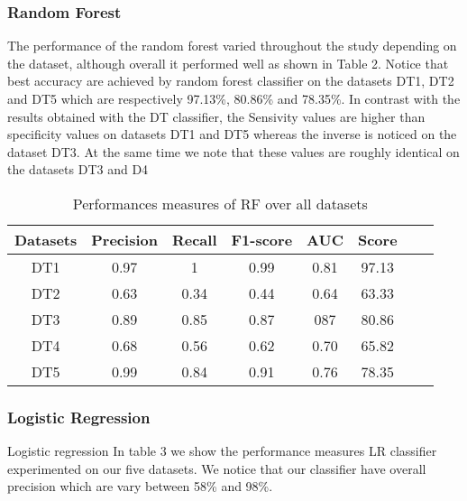 \subsubsection{Random Forest}
The performance of the random forest varied throughout the study depending on the dataset, although overall it performed well as shown in Table 2. Notice that best accuracy are achieved by random forest classifier on the datasets DT1, DT2 and DT5 which are respectively 97.13\%, 80.86\% and 78.35\%. In contrast with the results obtained with the DT classifier, the Sensivity values are higher than specificity values on datasets DT1 and DT5 whereas the inverse is noticed on the dataset DT3. At the same time we note that these values are roughly identical on the datasets DT3 and D4
\begin{table}[!ht]
\centering
\begin{tabular}{*{6}{c}l r}
  \toprule
  \textbf{Datasets} & \textbf{Precision} & \textbf{Recall} & \textbf{F1-score}&\textbf{AUC} &\textbf{Score}\\
   \midrule
  DT1 &0.97 &1   &0.99 &0.81 &97.13 \\
  DT2 &0.63  & 0.34  &0.44&0.64&63.33 \\
  DT3 &0.89 &0.85 &0.87&087&80.86\\
  DT4 &0.68 &0.56&0.62&0.70&65.82\\
  DT5 &0.99 &0.84&0.91&0.76&78.35\\
  
  
    \bottomrule
\end{tabular}
\caption{Performances measures of RF over all datasets}\label{perf-measure-dt1}
\end{table}


\subsubsection{Logistic Regression}

Logistic regression In table 3 we show the performance measures LR classifier experimented on our five datasets. We notice that our classifier have overall precision which are vary between 58\% and 98\%. 

